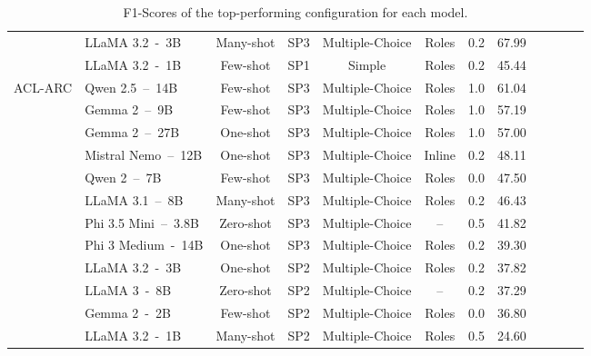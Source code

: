 \begin{table*}[t]
\begin{tabular}{clcccccccccc}
                                    & LLaMA 3.2~-~3B            & Many-shot     & SP3             & Multiple-Choice     & Roles             & 0.2           & 67.99  \\
                                    & LLaMA 3.2~-~1B            & Few-shot      & SP1             & Simple              & Roles             & 0.2           & 45.44  \\
        \hline
        \multirow{12}{*}{ACL-ARC}   & Qwen 2.5~--~14B           & Few-shot      & SP3             & Multiple-Choice     & Roles             & 1.0           & 61.04  \\
                                    & Gemma 2~--~9B             & Few-shot      & SP3             & Multiple-Choice     & Roles             & 1.0           & 57.19  \\
                                    & Gemma 2~--~27B            & One-shot      & SP3             & Multiple-Choice     & Roles             & 1.0           & 57.00  \\
                                    & Mistral Nemo~--~12B       & One-shot      & SP3             & Multiple-Choice     & Inline            & 0.2           & 48.11  \\
                                    & Qwen 2~--~7B              & Few-shot      & SP3             & Multiple-Choice     & Roles             & 0.0           & 47.50  \\
                                    & LLaMA 3.1~--~8B           & Many-shot     & SP3             & Multiple-Choice     & Roles             & 0.2           & 46.43  \\
                                    & Phi 3.5 Mini~--~3.8B      & Zero-shot     & SP3             & Multiple-Choice     & --                & 0.5           & 41.82  \\
                                    & Phi 3 Medium~-~14B        & One-shot      & SP3             & Multiple-Choice     & Roles             & 0.2           & 39.30  \\
                                    & LLaMA 3.2~-~3B            & One-shot      & SP2             & Multiple-Choice     & Roles             & 0.2           & 37.82  \\
                                    & LLaMA 3~-~8B              & Zero-shot     & SP2             & Multiple-Choice     & --                & 0.2           & 37.29  \\
                                    & Gemma 2~-~2B              & Few-shot      & SP2             & Multiple-Choice     & Roles             & 0.0           & 36.80   \\
                                    & LLaMA 3.2~-~1B            & Many-shot     & SP2             & Multiple-Choice     & Roles             & 0.5           & 24.60   \\
      \hline
    \end{tabular}
    \caption{F1-Scores of the top-performing configuration for each model.}\label{tab:best-config-per-model}
\end{table*}

